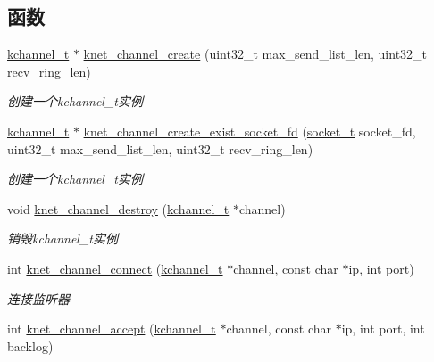 \subsection*{函数}
\begin{DoxyCompactItemize}
\item 
\hyperlink{a00056_aca9cd34897582aa9969245a93cc62fb5_aca9cd34897582aa9969245a93cc62fb5}{kchannel\+\_\+t} $\ast$ \hyperlink{a00051_af1bfbfb5240375789fcc89b087280ad8_af1bfbfb5240375789fcc89b087280ad8}{knet\+\_\+channel\+\_\+create} (uint32\+\_\+t max\+\_\+send\+\_\+list\+\_\+len, uint32\+\_\+t recv\+\_\+ring\+\_\+len)
\begin{DoxyCompactList}\small\item\em 创建一个kchannel\+\_\+t实例 \end{DoxyCompactList}\item 
\hyperlink{a00056_aca9cd34897582aa9969245a93cc62fb5_aca9cd34897582aa9969245a93cc62fb5}{kchannel\+\_\+t} $\ast$ \hyperlink{a00051_a6cfbae713bcd155703df7871a978dda6_a6cfbae713bcd155703df7871a978dda6}{knet\+\_\+channel\+\_\+create\+\_\+exist\+\_\+socket\+\_\+fd} (\hyperlink{a00056_a0d9e0afbf02fb6ed6c5b1415dce51b05_a0d9e0afbf02fb6ed6c5b1415dce51b05}{socket\+\_\+t} socket\+\_\+fd, uint32\+\_\+t max\+\_\+send\+\_\+list\+\_\+len, uint32\+\_\+t recv\+\_\+ring\+\_\+len)
\begin{DoxyCompactList}\small\item\em 创建一个kchannel\+\_\+t实例 \end{DoxyCompactList}\item 
void \hyperlink{a00051_ad6e14ad79303e00c50f1231bdf2447ff_ad6e14ad79303e00c50f1231bdf2447ff}{knet\+\_\+channel\+\_\+destroy} (\hyperlink{a00056_aca9cd34897582aa9969245a93cc62fb5_aca9cd34897582aa9969245a93cc62fb5}{kchannel\+\_\+t} $\ast$channel)
\begin{DoxyCompactList}\small\item\em 销毁kchannel\+\_\+t实例 \end{DoxyCompactList}\item 
int \hyperlink{a00051_a0b4008dc5d3faa3a445942b1eabe499f_a0b4008dc5d3faa3a445942b1eabe499f}{knet\+\_\+channel\+\_\+connect} (\hyperlink{a00056_aca9cd34897582aa9969245a93cc62fb5_aca9cd34897582aa9969245a93cc62fb5}{kchannel\+\_\+t} $\ast$channel, const char $\ast$ip, int port)
\begin{DoxyCompactList}\small\item\em 连接监听器 \end{DoxyCompactList}\item 
int \hyperlink{a00051_a719cb5a1d455fe1af74348effd93ec6f_a719cb5a1d455fe1af74348effd93ec6f}{knet\+\_\+channel\+\_\+accept} (\hyperlink{a00056_aca9cd34897582aa9969245a93cc62fb5_aca9cd34897582aa9969245a93cc62fb5}{kchannel\+\_\+t} $\ast$channel, const char $\ast$ip, int port, int backlog)

\end{DoxyCompactItemize}
